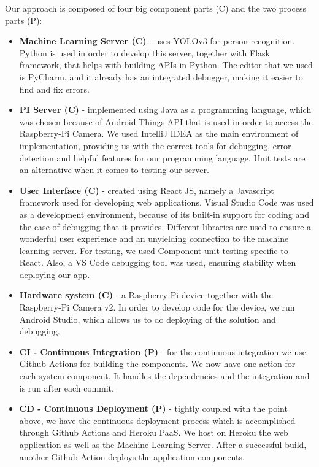 \documentclass[runningheads,a4paper,11pt]{report}
\begin{document}
Our approach is composed of four big component parts (C) and the two process parts (P):
\begin{itemize}
    \item \textbf{Machine Learning Server (C)} - uses YOLOv3 for person recognition. Python is used in order to develop this server, together with Flask framework, that helps with building APIs in Python. The editor that we used is PyCharm, and it already has an integrated debugger, making it easier to find and fix errors.
    \item \textbf{PI Server (C)} - implemented using Java as a programming language, which was chosen because of Android Things API that is used in order to access the Raspberry-Pi Camera. We used IntelliJ IDEA as the main environment of implementation, providing us with the correct tools for debugging, error detection and helpful features for our programming language. Unit tests are an alternative when it comes to testing our server.
    \item \textbf{User Interface (C)} - created using React JS, namely a Javascript framework used for developing web applications. Visual Studio Code was used as a development environment, because of its built-in support for coding and the ease of debugging that it provides. Different libraries are used to ensure a wonderful user experience and an unyielding connection to the machine learning server. For testing, we used Component unit testing specific to React. Also, a VS Code debugging tool was used, ensuring stability when deploying our app.
    \item \textbf{Hardware system (C)} - a Raspberry-Pi device together with the Raspberry-Pi Camera v2. In order to develop code for the device, we run Android Studio, which allows us to do deploying of the solution and debugging.
    \item \textbf{CI - Continuous Integration (P)} - for the continuous integration we use Github Actions for building the components. We now have one action for each system component. It handles the dependencies and the integration and is run after each commit.
    \item \textbf{CD - Continuous Deployment (P)} - tightly coupled with the point above, we have the continuous deployment process which is accomplished through Github Actions and Heroku PaaS. We host on Heroku the web application as well as the Machine Learning Server. After a successful build, another Github Action deploys the application components.
\end{itemize}
\end{document}
